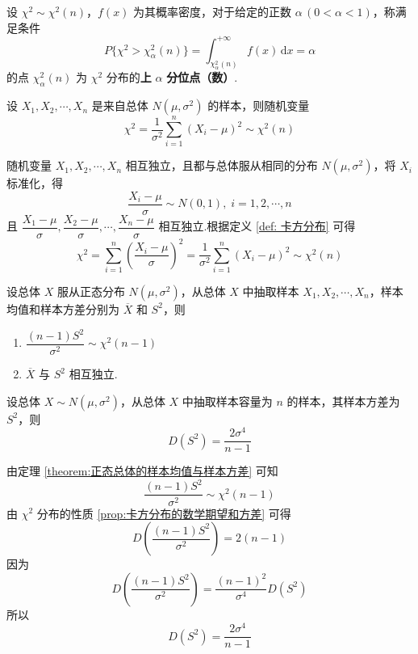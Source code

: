 \begin{definition}
    设 $\chi^2 \sim \chi^2(n)$，$f(x)$ 为其概率密度，对于给定的正数 $\alpha \, (0 < \alpha < 1)$，称满足条件
    $$
    P \{ \chi^2 > \chi_{\alpha}^2(n) \} = \int_{\chi_{\alpha}^2(n)}^{+\infty} f(x) \, \text{d}x = \alpha
    $$
    的点 $\chi_{\alpha}^2(n)$ 为 $\chi^2$ 分布的\textbf{上} $\alpha$ \textbf{分位点（数）}.
\end{definition}

\begin{theorem} \label{theorem:来自正态总体的样本标准化后求和，服从卡方分布}
    设 $X_1,X_2,\cdots,X_n$ 是来自总体 $N(\mu,\sigma^2)$ 的样本，则随机变量
    $$
    \chi^2 = \dfrac{1}{\sigma^2} \sum_{i=1}^n (X_i - \mu)^2 \sim \chi^2(n)
    $$
\end{theorem}

\begin{myproof}
    随机变量 $X_1,X_2,\cdots,X_n$ 相互独立，且都与总体服从相同的分布 $N(\mu,\sigma^2)$，将 $X_i$ 标准化，得
    $$
    \dfrac{X_i - \mu}{\sigma} \sim N(0,1), \; i=1,2,\cdots,n
    $$
    且 $\dfrac{X_1 - \mu}{\sigma}, \dfrac{X_2 - \mu}{\sigma},\cdots, \dfrac{X_n - \mu}{\sigma}$ 相互独立.根据定义 \ref{def: 卡方分布} 可得
    $$
    \chi^2 = \sum_{i=1}^n \left( \dfrac{X_i - \mu}{\sigma} \right)^2 = \dfrac{1}{\sigma^2} \sum_{i=1}^n (X_i - \mu)^2 \sim \chi^2(n)
    $$
\end{myproof}

\begin{theorem} \label{theorem:正态总体的样本均值与样本方差}
    设总体 $X$ 服从正态分布 $N(\mu,\sigma^2)$，从总体 $X$ 中抽取样本 $X_1,X_2,\cdots,X_n$，样本均值和样本方差分别为 $\overline{X}$ 和 $S^2$，则

    \begin{enumerate}
        \item $\dfrac{(n-1) S^2}{\sigma^2} \sim \chi^2(n-1)$
        \item $\overline{X}$ 与 $S^2$ 相互独立.
    \end{enumerate}
\end{theorem}

\begin{theorem}
    设总体 $X \sim N(\mu,\sigma^2)$，从总体 $X$ 中抽取样本容量为 $n$ 的样本，其样本方差为 $S^2$，则
    $$
    D(S^2) = \dfrac{2 \sigma^4}{n-1}
    $$
\end{theorem}

\begin{myproof}
    由定理 \ref{theorem:正态总体的样本均值与样本方差} 可知
    $$
    \dfrac{(n-1) S^2}{\sigma^2} \sim \chi^2(n-1)
    $$
    由 $\chi^2$ 分布的性质 \ref*{prop:卡方分布的数学期望和方差} 可得
    $$
    D \left( \dfrac{(n-1) S^2}{\sigma^2} \right) = 2(n-1)
    $$
    因为
    $$
    D \left( \dfrac{(n-1) S^2}{\sigma^2} \right) = \dfrac{(n-1)^2}{\sigma^4} D(S^2)
    $$
    所以
    $$
    D(S^2) = \dfrac{2 \sigma^4}{n-1}
    $$
\end{myproof}

